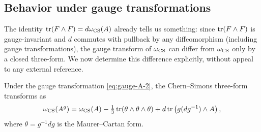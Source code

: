 \subsection{Behavior under gauge transformations}\label{subsec:gauge-transf-CS}

The identity $\operatorname{tr}(F\wedge F) = d\omega_{\operatorname{CS}}(A)$ already tells us something: since $\operatorname{tr}(F\wedge F)$ is gauge-invariant and $d$ commutes with pullback by any diffeomorphism (including gauge transformations), the gauge transform of $\omega_{\operatorname{CS}}$ can differ from $\omega_{\operatorname{CS}}$ only by a closed three-form. We now determine this difference explicitly, without appeal to any external reference.

\begin{proposition}\label{prop:CS-gauge}
Under the gauge transformation \eqref{eq:gauge-A-2}, the Chern--Simons three-form transforms as
\begin{equation}\label{eq:CS-gauge}
\omega_{\operatorname{CS}}(A^g) = \omega_{\operatorname{CS}}(A) - \tfrac{1}{3}\operatorname{tr}(\theta\wedge\theta\wedge\theta) + d\operatorname{tr}\left(g(dg^{-1})\wedge A\right),
\end{equation}
where $\theta = g^{-1}dg$ is the Maurer--Cartan form.
\end{proposition}

